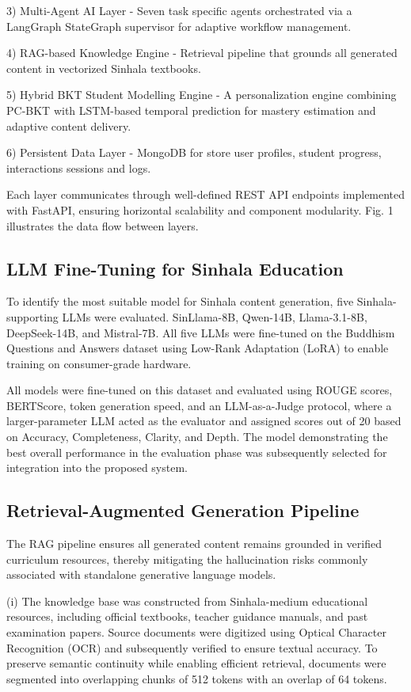 \documentclass[conference]{IEEEtran}
\begin{document}
3) Multi-Agent AI Layer - Seven task specific agents orchestrated via a LangGraph StateGraph supervisor for adaptive workflow management.

4) RAG-based Knowledge Engine - Retrieval pipeline that grounds all generated content in vectorized Sinhala textbooks.

5) Hybrid BKT Student Modelling Engine - A personalization engine combining PC-BKT with LSTM-based temporal prediction for mastery estimation and adaptive content delivery.

6) Persistent Data Layer - MongoDB for store user profiles, student progress, interactions sessions and logs.

Each layer communicates through well-defined REST API endpoints implemented with FastAPI, ensuring horizontal scalability and component modularity. Fig. 1 illustrates the data flow between layers.

\vspace{-0.5em}
\subsection{LLM Fine-Tuning for Sinhala Education}
\vspace{-0.5em}
To identify the most suitable model for Sinhala content generation, five Sinhala-supporting LLMs were evaluated. SinLlama-8B, Qwen-14B, Llama-3.1-8B, DeepSeek-14B, and Mistral-7B. All five LLMs were fine-tuned on the Buddhism Questions and Answers dataset using Low-Rank Adaptation (LoRA) \cite{b18} to enable training on consumer-grade hardware.

All models were fine-tuned on this dataset and evaluated using ROUGE scores, BERTScore, token generation speed, and an LLM-as-a-Judge protocol, where a larger-parameter LLM acted as the evaluator and assigned scores out of 20 based on Accuracy, Completeness, Clarity, and Depth. The model demonstrating the best overall performance in the evaluation phase was subsequently selected for integration into the proposed system.

\subsection{Retrieval-Augmented Generation Pipeline}
The RAG pipeline ensures all generated content remains grounded in verified curriculum resources, thereby mitigating the hallucination risks commonly associated with standalone generative language models.

(i) The knowledge base was constructed from Sinhala-medium educational resources, including official textbooks, teacher guidance manuals, and past examination papers. Source documents were digitized using Optical Character Recognition (OCR) and subsequently verified to ensure textual accuracy. To preserve semantic continuity while enabling efficient retrieval, documents were segmented into overlapping chunks of 512 tokens with an overlap of 64 tokens.
\end{document}
